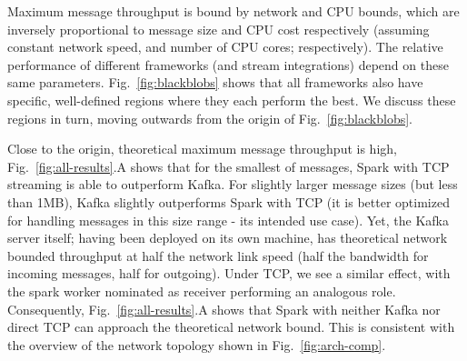 \documentclass[conference]{IEEEtran}
\begin{document}


Maximum message throughput is bound by network and CPU bounds, which are inversely proportional to message size and CPU cost respectively (assuming constant network speed, and number of CPU cores; respectively). The relative performance of different frameworks (and stream integrations) depend on these same parameters. Fig.~\ref{fig:blackblobs} shows that all frameworks also have specific, well-defined regions where they each perform the best. We discuss these regions in turn, moving outwards from the origin of Fig.~\ref{fig:blackblobs}.

Close to the origin, theoretical maximum message throughput is high, Fig.~\ref{fig:all-results}.A shows that for the smallest of messages, Spark with TCP streaming is able to outperform Kafka. 
For slightly larger message sizes (but less than 1MB), Kafka slightly outperforms Spark with TCP (it is better optimized for handling messages in this size range - its intended use case). Yet, the Kafka server itself; having been deployed on its own machine, has theoretical network bounded throughput at half the network link speed (half the bandwidth for incoming messages, half for outgoing). Under TCP, we see a similar effect, with the spark worker nominated as receiver performing an analogous role. Consequently, Fig.~\ref{fig:all-results}.A shows that Spark with neither Kafka nor direct TCP can approach the theoretical network bound. This is consistent with the overview of the network topology shown in Fig.~\ref{fig:arch-comp}.
\end{document}
